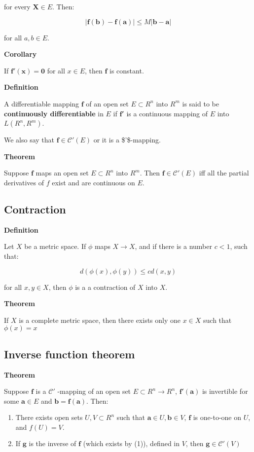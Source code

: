 \documentclass[11pt]{article}
\begin{document}
for every \(\bm{X} \in E\). Then:

\[
\vert \bm{f(b) - f(a)} \vert \leq  M \vert \bm{b - a} \vert
\]

for all \(a,b \in E\).

\textbf{Corollary}

If \(\bm{f'(x) = 0}\) for all \(x \in E\), then \(\bm{f}\) is constant.

\textbf{Definition}

A differentiable mapping \(\bm{f}\) of an open set \(E \subset R^n\) into \(R^m\) is said to be \textbf{continuously differentiable} in \(E\) if \(\bm{f'}\) is a continuous mapping of \(E\) into \(L(R^n,R^m)\).

We also say that \(\bm{f} \in \mathcal{C}'(E)\) or it is a \$'\$-mapping.

\textbf{Theorem}

Suppose \(\bm{f}\) maps an open set \(E \subset R^n\) into \(R^m\). Then \(\bm{f}\in\mathcal{C}'(E)\) iff all the partial derivatives of \(f\) exist and are continuous on \(E\).


\subsection{Contraction}
\label{sec:org6d8f133}

\textbf{Definition}

Let \(X\) be a metric space. If \(\phi\) maps \(X \to X\), and if there is a number \(c < 1\), such that:

\[
d(\phi(x),\phi(y)) \leq c d(x,y)
\]

for all \(x,y\in X\), then \(\phi\) is a a contraction of \(X\) into \(X\).

\textbf{Theorem}

If \(X\) is a complete metric space, then there exists only one \(x \in X\) such that \(\phi(x) = x\)


\subsection{Inverse function theorem}
\label{sec:org1d4e689}

\textbf{Theorem}

Suppose \(\bm{f}\) is a \(\mathcal{C}'\) -mapping of an open set \(E \subset R^n \to R^n\), \(\bm{f'(a)}\) is invertible for some \(\bm{a} \in E\) and \(\bm{b = f(a)}\). Then:

\begin{enumerate}
\item There exists open sets \(U,V \subset R^n\) such that \(\bm{a} \in U, \bm{b} \in V\), \(\bm{f}\) is one-to-one on \(U\), and \(f(U) = V\).
\item If \(\bm{g}\) is the inverse of \(\bm{f}\) (which exists by (1)), defined in \(V\), then \(\bm{g} \in \mathcal{C}'(V)\)
\end{enumerate}
\end{document}

